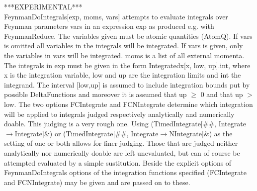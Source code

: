 


\dispSFoutmath{
\underline{\sum }
}












***EXPERIMENTAL***\\
\hspace*{0.5ex} FeynmanDoIntegrals[exp, moms, vars] attempts to evaluate integrals over Feynman parameters vars in an expression exp as
  produced e.g. with FeynmanReduce. The variables given must be atomic quantities (AtomQ). If vars is omitted all variables in the
  integrals will be integrated. If vars is given, only the variables in vars will be integrated. moms is a list of all external momenta.
  The integrals in exp must be given in the form Integratedx[x, low, up].int, where x is the integration variable, low and up are the
  integration limits and int the integrand. The interval [low,up] is assumed to include integration bounds put by possible DeltaFunctions
  and moreover it is assumed that up \(\geq \) 0 and that up \(>\) low. The two options FCIntegrate and FCNIntegrate determine which
  integration will be applied to integrals judged respectively analytically and numerically doable. This judging is a very rough one.
  Using (TimedIntegrate[\#{}\#{}, Integrate\(\rightarrow \)Integrate]\&{}) or (TimedIntegrate[\#{}\#{}, Integrate\(\rightarrow
  \)NIntegrate]\&{}) as the setting of one or both allows for finer judging. Those that are judged neither analytically nor numerically
  doable are left unevaluated, but can of course be attempted evaluated by a simple sustitution. Beside the explicit options of
  FeynmanDoIntegrals options of the integration functions specified (FCIntegrate and FCNIntegrate) may be given and are passed on to
  these.


